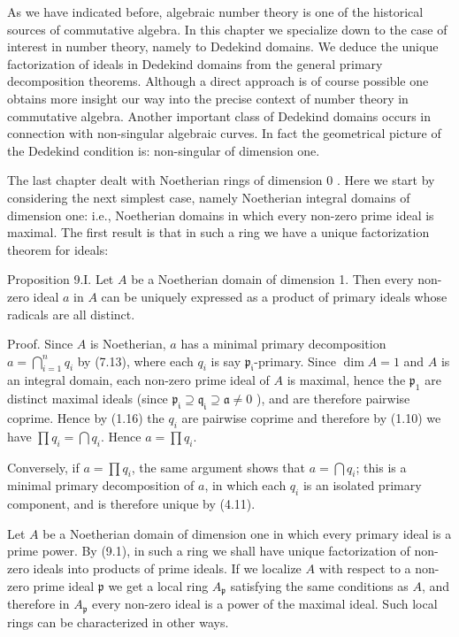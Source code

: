 \documentclass{standalone}
\theoremstyle{definition}
\theoremstyle{remark}
\begin{document}
As we have indicated before, algebraic number theory is one of the historical sources of commutative algebra. In this chapter we specialize down to the case of interest in number theory, namely to Dedekind domains. We deduce the unique factorization of ideals in Dedekind domains from the general primary decomposition theorems. Although a direct approach is of course possible one obtains more insight our way into the precise context of number theory in commutative algebra. Another important class of Dedekind domains occurs in connection with non-singular algebraic curves. In fact the geometrical picture of the Dedekind condition is: non-singular of dimension one.

The last chapter dealt with Noetherian rings of dimension 0 . Here we start by considering the next simplest case, namely Noetherian integral domains of dimension one: i.e., Noetherian domains in which every non-zero prime ideal is maximal. The first result is that in such a ring we have a unique factorization theorem for ideals:

Proposition 9.I. Let $A$ be a Noetherian domain of dimension 1. Then every non-zero ideal $a$ in $A$ can be uniquely expressed as a product of primary ideals whose radicals are all distinct.

Proof. Since $A$ is Noetherian, $a$ has a minimal primary decomposition $a=\bigcap_{i=1}^{n} q_{i}$ by (7.13), where each $q_{i}$ is say $\mathfrak{p}_{\mathfrak{i}}$-primary. Since $\operatorname{dim} A=1$ and $A$ is an integral domain, each non-zero prime ideal of $A$ is maximal, hence the $\mathfrak{p}_{1}$ are distinct maximal ideals (since $\mathfrak{p}_{\mathfrak{i}} \supseteq \mathfrak{q}_{\mathfrak{i}} \supseteq \mathfrak{a} \neq 0$ ), and are therefore pairwise coprime. Hence by (1.16) the $q_{i}$ are pairwise coprime and therefore by (1.10) we have $\prod q_{i}=\bigcap q_{i}$. Hence $a=\prod q_{i}$.

Conversely, if $a=\prod q_{i}$, the same argument shows that $a=\bigcap q_{i}$; this is a minimal primary decomposition of $a$, in which each $q_{i}$ is an isolated primary component, and is therefore unique by (4.11).

Let $A$ be a Noetherian domain of dimension one in which every primary ideal is a prime power. By (9.1), in such a ring we shall have unique factorization of non-zero ideals into products of prime ideals. If we localize $A$ with respect to a non-zero prime ideal $\mathfrak{p}$ we get a local ring $A_{\mathfrak{p}}$ satisfying the same conditions as $A$, and therefore in $A_{\mathfrak{p}}$ every non-zero ideal is a power of the maximal ideal. Such local rings can be characterized in other ways.
\end{document}
